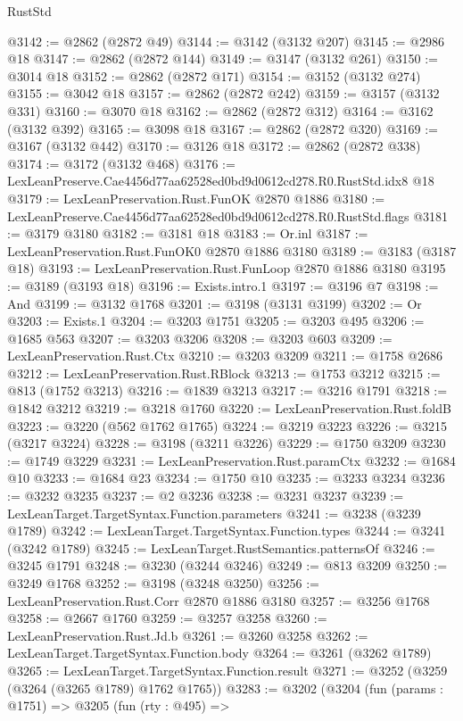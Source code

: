 \begin{lexlean}{RustStd}
\begin{coremodule}
@3142 := @2862 (@2872 @49)
@3144 := @3142 (@3132 @207)
@3145 := @2986 @18
@3147 := @2862 (@2872 @144)
@3149 := @3147 (@3132 @261)
@3150 := @3014 @18
@3152 := @2862 (@2872 @171)
@3154 := @3152 (@3132 @274)
@3155 := @3042 @18
@3157 := @2862 (@2872 @242)
@3159 := @3157 (@3132 @331)
@3160 := @3070 @18
@3162 := @2862 (@2872 @312)
@3164 := @3162 (@3132 @392)
@3165 := @3098 @18
@3167 := @2862 (@2872 @320)
@3169 := @3167 (@3132 @442)
@3170 := @3126 @18
@3172 := @2862 (@2872 @338)
@3174 := @3172 (@3132 @468)
@3176 := LexLeanPreserve.Cae4456d77aa62528ed0bd9d0612cd278.R0.RustStd.idx8 @18
@3179 := LexLeanPreservation.Rust.FunOK @2870 @1886
@3180 := LexLeanPreserve.Cae4456d77aa62528ed0bd9d0612cd278.R0.RustStd.flags
@3181 := @3179 @3180
@3182 := @3181 @18
@3183 := Or.inl
@3187 := LexLeanPreservation.Rust.FunOK0 @2870 @1886 @3180
@3189 := @3183 (@3187 @18)
@3193 := LexLeanPreservation.Rust.FunLoop @2870 @1886 @3180
@3195 := @3189 (@3193 @18)
@3196 := Exists.intro.{1}
@3197 := @3196 @7
@3198 := And
@3199 := @3132 @1768
@3201 := @3198 (@3131 @3199)
@3202 := Or
@3203 := Exists.{1}
@3204 := @3203 @1751
@3205 := @3203 @495
@3206 := @1685 @563
@3207 := @3203 @3206
@3208 := @3203 @603
@3209 := LexLeanPreservation.Rust.Ctx
@3210 := @3203 @3209
@3211 := @1758 @2686
@3212 := LexLeanPreservation.Rust.RBlock
@3213 := @1753 @3212
@3215 := @813 (@1752 @3213)
@3216 := @1839 @3213
@3217 := @3216 @1791
@3218 := @1842 @3212
@3219 := @3218 @1760
@3220 := LexLeanPreservation.Rust.foldB
@3223 := @3220 (@562 @1762 @1765)
@3224 := @3219 @3223
@3226 := @3215 (@3217 @3224)
@3228 := @3198 (@3211 @3226)
@3229 := @1750 @3209
@3230 := @1749 @3229
@3231 := LexLeanPreservation.Rust.paramCtx
@3232 := @1684 @10
@3233 := @1684 @23
@3234 := @1750 @10
@3235 := @3233 @3234
@3236 := @3232 @3235
@3237 := @2 @3236
@3238 := @3231 @3237
@3239 := LexLeanTarget.TargetSyntax.Function.parameters
@3241 := @3238 (@3239 @1789)
@3242 := LexLeanTarget.TargetSyntax.Function.types
@3244 := @3241 (@3242 @1789)
@3245 := LexLeanTarget.RustSemantics.patternsOf
@3246 := @3245 @1791
@3248 := @3230 (@3244 @3246)
@3249 := @813 @3209
@3250 := @3249 @1768
@3252 := @3198 (@3248 @3250)
@3256 := LexLeanPreservation.Rust.Corr @2870 @1886 @3180
@3257 := @3256 @1768
@3258 := @2667 @1760
@3259 := @3257 @3258
@3260 := LexLeanPreservation.Rust.Jd.b
@3261 := @3260 @3258
@3262 := LexLeanTarget.TargetSyntax.Function.body
@3264 := @3261 (@3262 @1789)
@3265 := LexLeanTarget.TargetSyntax.Function.result
@3271 := @3252 (@3259 (@3264 (@3265 @1789) @1762 @1765))
@3283 := @3202
    (@3204
      (fun (params : @1751) =>
      @3205
        (fun (rty : @495) =>

\end{coremodule}
\end{lexlean}
